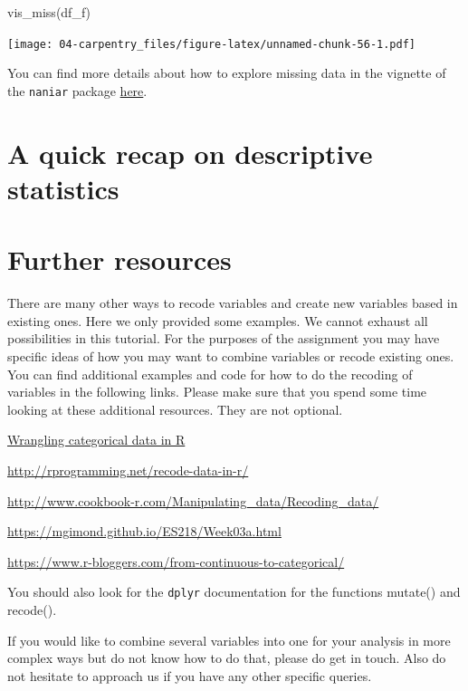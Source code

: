 \documentclass[
]{book}
\newenvironment{Shaded}{\begin{snugshade}}{\end{snugshade}}
\newcommand{\FunctionTok}[1]{\textcolor[rgb]{0.00,0.00,0.00}{#1}}
\newcommand{\NormalTok}[1]{#1}
\begin{document}
\begin{Shaded}
\begin{Highlighting}[]
\FunctionTok{vis\_miss}\NormalTok{(df\_f)}
\end{Highlighting}
\end{Shaded}

\texttt{[image: 04-carpentry\_files/figure-latex/unnamed-chunk-56-1.pdf]}

You can find more details about how to explore missing data in the vignette of the \texttt{naniar} package \href{http://naniar.njtierney.com/articles/getting-started-w-naniar.html}{here}.

\hypertarget{a-quick-recap-on-descriptive-statistics}{%
\section{A quick recap on descriptive statistics}\label{a-quick-recap-on-descriptive-statistics}}

\hypertarget{further-resources-1}{%
\section{Further resources}\label{further-resources-1}}

There are many other ways to recode variables and create new variables based in existing ones. Here we only provided some examples. We cannot exhaust all possibilities in this tutorial. For the purposes of the assignment you may have specific ideas of how you may want to combine variables or recode existing ones. You can find additional examples and code for how to do the recoding of variables in the following links. Please make sure that you spend some time looking at these additional resources. They are not optional.

\href{https://peerj.com/preprints/3163.pdf}{Wrangling categorical data in R}

\url{http://rprogramming.net/recode-data-in-r/}

\url{http://www.cookbook-r.com/Manipulating_data/Recoding_data/}

\url{https://mgimond.github.io/ES218/Week03a.html}

\url{https://www.r-bloggers.com/from-continuous-to-categorical/}

You should also look for the \texttt{dplyr} documentation for the functions mutate() and recode().

If you would like to combine several variables into one for your analysis in more complex ways but do not know how to do that, please do get in touch. Also do not hesitate to approach us if you have any other specific queries.
\end{document}
